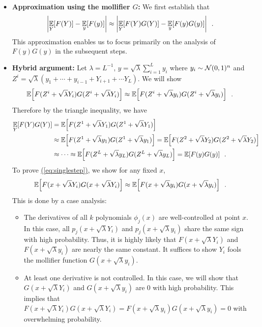 \documentclass[12pt]{article}
\newcommand{\eq}[1]{\hyperref[eq:#1]{(\ref*{eq:#1})}}
\begin{document}
\begin{itemize}
	\item \textbf{Approximation using the mollifier $G$:}
	We first establish that
	\[
	\left|
		\operatorname*{\mathbb{E}}_{\substack{Y}}\!\left[
			F(Y)	
		\right]
		-
		\operatorname*{\mathbb{E}}_{\substack{y}}\!\left[
			F(y)
		\right]
	 \right| \approx 
	\left|
		\operatorname*{\mathbb{E}}_{\substack{Y}}\!\left[
			F(Y)G(Y)	
		\right]
		-
		\operatorname*{\mathbb{E}}_{\substack{y}}\!\left[
			F(y)G(y)
		\right]
	 \right|\enspace.
	\]
	This approximation enables us to focus primarily on the analysis of $F(y)G(y)$ in the subsequent steps.
	\item \textbf{Hybrid argument:} Let $\lambda = L^{-1}$, $y = \sqrt{\lambda}\sum_{i=1}^L y_i$ where $y_i\sim \mathcal{N}(0,1)^n$ and $Z^i =\sqrt{\lambda}(y_1 + \cdots +y_{i-1} +Y_{i+1} +\cdots Y_L)$. We will show 
	\begin{align}
		\operatorname*{\mathbb{E}}_{\substack{ }}\!\left[
			F(Z^i+\sqrt{\lambda}Y_i)G(Z^i+\sqrt{\lambda}Y_i)	
		\right]
		\approx
		\operatorname*{\mathbb{E}}_{\substack{ }}\!\left[
			F(Z^i+\sqrt{\lambda}y_i)G(Z^i+\sqrt{\lambda}y_i)
		\right] \enspace.\label{eq:singlestep}
	\end{align}
	Therefore by the triangle inequality, we have
	\begin{align*}
		\operatorname*{\mathbb{E}}_{\substack{Y}}\!\left[
			F(Y)G(Y)	
		\right] &= \operatorname*{\mathbb{E}}_{\substack{ }}\!\left[
			F(Z^1+\sqrt{\lambda}Y_1)G(Z^1+\sqrt{\lambda}Y_1)	
		\right]\\
		&\approx
		\operatorname*{\mathbb{E}}_{\substack{ }}\!\left[
			F(Z^1+\sqrt{\lambda}y_1)G(Z^1+\sqrt{\lambda}y_1)
		\right]
		= \operatorname*{\mathbb{E}}_{\substack{ }}\!\left[
			F(Z^2+\sqrt{\lambda}Y_2)G(Z^2+\sqrt{\lambda}Y_2)	
		\right]\\
		&\approx \cdots \approx
		\operatorname*{\mathbb{E}}_{\substack{ }}\!\left[
			F(Z^L+\sqrt{\lambda}y_L)G(Z^L+\sqrt{\lambda}y_L)
		\right]= \operatorname*{\mathbb{E}}_{\substack{ }}\!\left[
			F(y)G(y)
		\right] \enspace.
	\end{align*}
	To prove \eq{singlestep}, we show for any fixed $x$,
	\[
		\operatorname*{\mathbb{E}}_{\substack{}}\!\left[
			F(x+\sqrt{\lambda}Y_i)G(x+\sqrt{\lambda}Y_i)
		\right]
		\approx
		\operatorname*{\mathbb{E}}_{\substack{}}\!\left[
			F(x+\sqrt{\lambda}y_i)G(x+\sqrt{\lambda}y_i)
		\right] \enspace .
	\]
	This is done by a case analysis:
	\begin{itemize}
	\item The derivatives of all $k$ polynomials $\phi_j(x)$ are well-controlled at point $x$. In this case, all $p_j(x+\sqrt{\lambda} Y_i)$ and $p_j(x+\sqrt{\lambda} y_i)$ share the same sign with high probability. Thus, it is highly likely that $F(x+\sqrt{\lambda}Y_i)$ and $F(x+\sqrt{\lambda}y_i)$ are nearly the same constant. It suffices to show $Y_i$ fools the mollifier function $G(x+\sqrt{\lambda}y_i)$.
	\item At least one derivative is not controlled. In this case, we will show that $G(x+\sqrt{\lambda}Y_i)$ and $G(x+\sqrt{\lambda}y_i)$ are $0$ with high probability. This implies that $F(x+\sqrt{\lambda}Y_i)G(x+\sqrt{\lambda}Y_i) = F(x+\sqrt{\lambda}y_i)G(x+\sqrt{\lambda}y_i) = 0$ with overwhelming probability.
	\end{itemize}
	\end{itemize}
	
\end{document}
